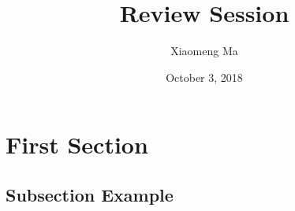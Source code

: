 \documentclass{beamer}
\title[LNG 230/SPV 221 Language Acquisition]{Review Session} %
\author{Xiaomeng Ma} %
\institute[Graduate Center, CUNY] %
{Graduate Center, CUNY \\ %
\medskip
\textit{xma3@gradcenter.cuny.edu} %
}
\date{October 3, 2018} %
\begin{document}
\begin{frame}
\titlepage %
\end{frame}



\section{First Section} %

\subsection{Subsection Example} %
\end{document}
